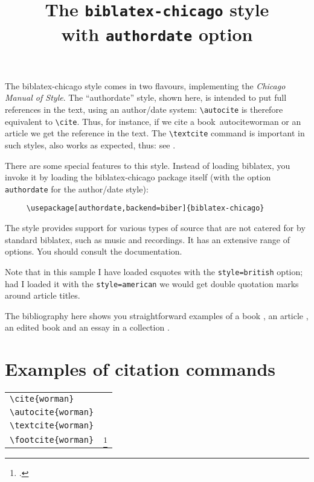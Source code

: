 \documentclass{article}
\begin{document}
\title{The \texttt{biblatex-chicago} style\\with \texttt{authordate} option}
\author{}\date{}
\maketitle
\thispagestyle{empty}\pagestyle{empty}

\noindent
The \textsf{biblatex-chicago} style comes in two flavours, implementing the \emph{Chicago Manual of Style}. The \enquote{authordate} style, shown here, is intended to put full references in the text, using an author/date system: \verb|\autocite| is therefore equivalent to \verb|\cite|. Thus, for instance, if we cite a book\ autocite{worman} or an article \autocite{reese} we get the reference in the text. The \verb|\textcite| command is important in such styles, also works as expected, thus: see \textcite{worman}.

\quad There are some special features to this style. Instead of loading \textsf{biblatex}, you invoke it by loading the \textsf{biblatex-chicago} package itself (with the option \verb|authordate| for the author/date style):
\begin{verbatim}
     \usepackage[authordate,backend=biber]{biblatex-chicago}
\end{verbatim}
The style provides support for various types of source that are not catered for by standard \textsf{biblatex}, such as music and recordings. It has an extensive range of options. You should consult the documentation.

Note that in this sample I have loaded \textsf{csquotes} with the \verb~style=british~ option; had I loaded it with the \verb~style=american~ we would get double quotation marks around article titles.

The bibliography here shows you straightforward examples of a book \autocite{worman}, an article \autocite{reese}, an edited book \autocite{aristotle:anima} and an essay in a collection \autocite{gaonkar:in}.

\section*{Examples of citation commands}

\begin{tabular}{ll}
\verb|\cite{worman}| & \cite{worman} \\
\verb|\autocite{worman}| & \autocite{worman} \\
\verb|\textcite{worman}| & \textcite{worman} \\
\verb|\footcite{worman}| & \strut\footcite{worman}
\end{tabular}

\printbibliography
\end{document}

